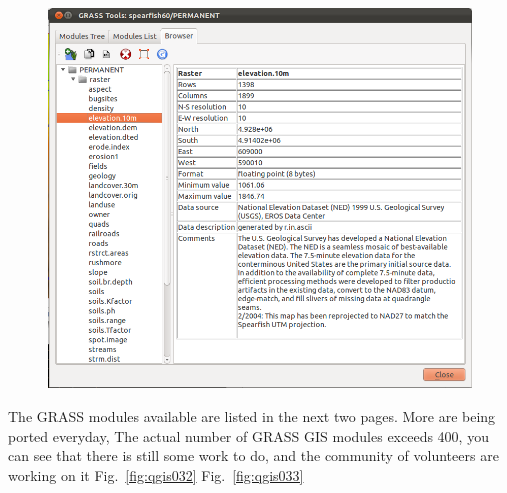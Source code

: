 \begin{figure}[htbp]
   \centering
   \includegraphics[scale=0.2]{qgis031.png}
   \caption{}
   \label{fig:qgis031}
\end{figure}

The GRASS modules available are listed in the next two pages. More are
being ported everyday, The actual number of GRASS GIS modules exceeds
400, you can see that there is still some work to do, and the community
of volunteers are working on it Fig.~\ref{fig:qgis032} Fig.~\ref{fig:qgis033}

